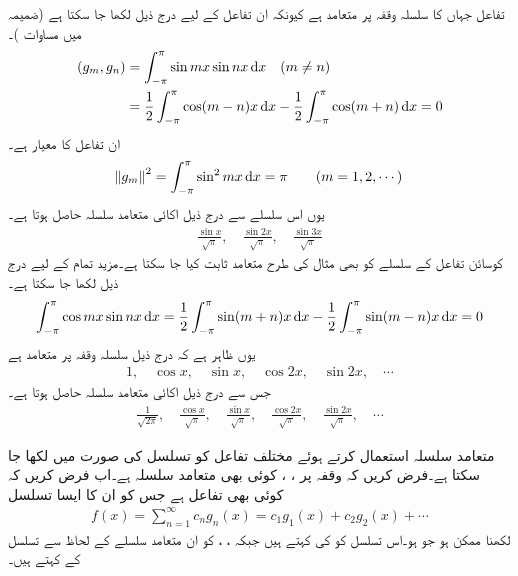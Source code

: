 تفاعل   جہاں  کا سلسلہ وقفہ  پر متعامد ہے کیونکہ ان تفاعل کے لیے درج ذیل لکھا جا سکتا ہے (ضمیمہ  میں مساوات )۔
\begin{gather}
\begin{aligned}
(g_m,g_n)&=\int_{-\pi}^{\pi}\sin mx\sin nx\dif x\quad (m\ne n)\\
&=\frac{1}{2}\int_{-\pi}^{\pi}\cos(m-n)x\dif x-\frac{1}{2}\int_{-\pi}^{\pi}\cos(m+n)\dif x=0
\end{aligned}
\end{gather}
ان تفاعل کا معیار   ہے۔
\begin{align*}
\norm{g_m}^2=\int_{-\pi}^{\pi} \sin^2 mx\dif x=\pi\quad \quad (m=1,2,\cdots)
\end{align*} 
یوں اس سلسلے سے درج ذیل اکائی متعامد سلسلہ حاصل ہوتا ہے۔
\begin{align*}
\frac{\sin x}{\sqrt{\pi}},\quad \frac{\sin 2x}{\sqrt{\pi}},\quad \frac{\sin 3x}{\sqrt{\pi}}
\end{align*} 
کوسائن تفاعل  کے سلسلے کو بھی مثال  کی طرح متعامد ثابت کیا جا سکتا ہے۔مزید تمام  کے لیے درج ذیل لکھا جا سکتا ہے۔
\begin{align*}
\int_{-\pi}^{\pi} \cos mx \sin nx \dif x=\frac{1}{2}\int_{-\pi}^{\pi}\sin(m+n)x\dif x-\frac{1}{2}\int_{-\pi}^{\pi}\sin(m-n)x \dif x=0
\end{align*}
یوں ظاہر ہے کہ درج ذیل سلسلہ  وقفہ  پر متعامد ہے
\begin{align*}
1,\quad \cos x,\quad \sin x,\quad \cos 2x,\quad \sin 2x,\quad \cdots
\end{align*}
جس سے درج ذیل اکائی متعامد سلسلہ حاصل ہوتا ہے۔
\begin{align*}
\frac{1}{\sqrt{2\pi}},\quad \frac{\cos x}{\sqrt{\pi}},\quad \frac{\sin x}{\sqrt{\pi}},\quad \frac{\cos 2x}{\sqrt{\pi}},\quad \frac{\sin 2x}{\sqrt{\pi}},\quad \cdots
\end{align*}

متعامد سلسلہ استعمال کرتے ہوئے مختلف تفاعل کو تسلسل کی صورت میں لکھا جا سکتا ہے۔فرض کریں کہ وقفہ  پر ، ،  کوئی بھی متعامد سلسلہ ہے۔اب فرض کریں کہ  کوئی بھی تفاعل ہے جس کو ان  کا ایسا تسلسل
\begin{align}\label{مساوات_طاقتی_اضافی_فوریئر_عمومی_الف}
f(x)=\sum_{n=1}^{\infty} c_n g_n(x)=c_1g_1(x)+c_2g_2(x)+\cdots
\end{align}
لکھنا ممکن ہو جو  ہو۔اس تسلسل کو  کی  کہتے ہیں جبکہ ، ،  کو ان متعامد سلسلے کے لحاظ سے تسلسل کے  کہتے ہیں۔ 

